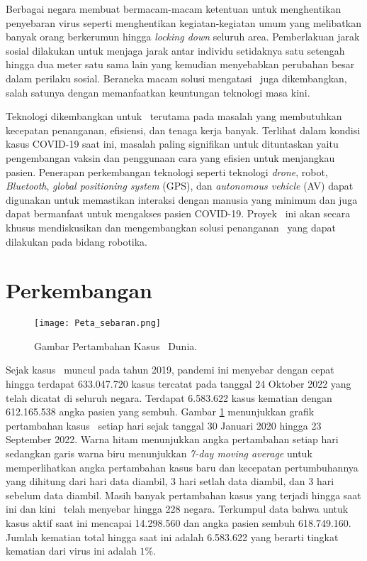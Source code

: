 Berbagai negara membuat bermacam-macam ketentuan untuk menghentikan penyebaran virus seperti menghentikan kegiatan-kegiatan umum yang melibatkan banyak orang berkerumun hingga \textit{locking down} seluruh area. Pemberlakuan jarak sosial dilakukan untuk menjaga jarak antar individu setidaknya satu setengah hingga dua meter satu sama lain yang kemudian menyebabkan perubahan besar dalam perilaku sosial. Beraneka macam solusi mengatasi \covid\ juga dikembangkan, salah satunya dengan memanfaatkan keuntungan teknologi masa kini. 

Teknologi dikembangkan untuk \covid\ terutama pada masalah yang membutuhkan kecepatan penanganan, efisiensi, dan tenaga kerja banyak. Terlihat dalam kondisi kasus COVID-19 saat ini, masalah paling signifikan untuk dituntaskan yaitu pengembangan vaksin dan penggunaan cara yang efisien untuk menjangkau pasien. Penerapan perkembangan teknologi seperti teknologi \textit{drone}, robot, \textit{Bluetooth}, \textit{global positioning system} (GPS), dan \textit{autonomous vehicle} (AV) dapat digunakan untuk memastikan interaksi dengan manusia yang minimum dan juga dapat bermanfaat untuk mengakses pasien COVID-19. Proyek \capstone\ ini akan secara khusus mendiskusikan dan mengembangkan solusi penanganan \covid\ yang dapat dilakukan pada bidang robotika. 

\section{Perkembangan \covid}
\label{sec:Perkembangan_covid}

\begin{figure}[H]
    \centering
    \texttt{[image: Peta\_sebaran.png]}
    \caption{Gambar Pertambahan Kasus \covid\ Dunia\cite{a3}.}
    \label{fig:Ch01_denah}
\end{figure}
Sejak kasus \covid\ muncul pada tahun 2019, pandemi ini menyebar dengan cepat hingga terdapat 633.047.720 kasus tercatat pada tanggal 24 Oktober 2022 yang telah dicatat di seluruh negara. Terdapat 6.583.622 kasus kematian dengan 612.165.538 angka pasien yang sembuh. 
Gambar \ref*{fig:Ch01_denah} menunjukkan grafik pertambahan kasus \covid\ setiap hari sejak tanggal 30 Januari 2020 hingga 23 September 2022. Warna hitam menunjukkan angka pertambahan setiap hari sedangkan garis warna biru menunjukkan \textit{7-day moving average} untuk memperlihatkan angka pertambahan kasus baru dan kecepatan pertumbuhannya yang dihitung dari hari data diambil, 3 hari setlah data diambil, dan 3 hari sebelum data diambil. Masih banyak pertambahan kasus yang terjadi hingga saat ini dan kini \covid\ telah menyebar hingga 228 negara. Terkumpul data bahwa untuk kasus aktif saat ini mencapai 14.298.560 dan angka pasien sembuh 618.749.160. Jumlah kematian total hingga saat ini adalah 6.583.622 yang berarti tingkat kematian dari virus ini adalah $1\%$\cite{a4}. 


